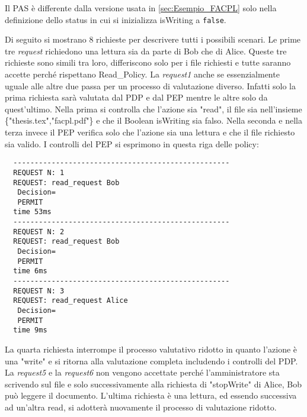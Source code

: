 Il \ac{PAS} è differente dalla versione usata in \ref{sec:Esempio_FACPL} solo nella definizione dello status
in cui si inizializza isWriting a \texttt{false}.
\clearpage

Di seguito si mostrano 8 richieste per descrivere tutti i possibili scenari.
Le prime tre \emph{request} richiedono una lettura sia da parte di Bob che di Alice. Queste tre richieste sono simili tra loro,
differiscono solo per i file richiesti e tutte saranno accette perché rispettano Read\_Policy. La \emph{request1} anche
se essenzialmente uguale alle altre due passa per un processo di valutazione diverso. Infatti solo la prima richiesta
sarà valutata dal \ac{PDP} e dal \ac{PEP} mentre le altre solo da quest'ultimo. Nella prima si controlla che l'azione sia "read",
il file sia nell'insieme \{"thesis.tex","facpl.pdf"\} e che il Boolean isWriting sia falso. Nella seconda e nella terza
invece il \ac{PEP} verifica solo che l'azione sia una lettura e che il file richiesto sia valido.
I controlli del \ac{PEP} si esprimono in questa riga delle policy:


\begin{verbatim}
  ---------------------------------------------------
  REQUEST N: 1
  REQUEST: read_request Bob
   Decision=
   PERMIT
  time 53ms
  ---------------------------------------------------
  REQUEST N: 2
  REQUEST: read_request Bob
   Decision=
   PERMIT
  time 6ms
  ---------------------------------------------------
  REQUEST N: 3
  REQUEST: read_request Alice
   Decision=
   PERMIT
  time 9ms
\end{verbatim}
La quarta richiesta interrompe il processo valutativo ridotto in quanto l'azione è una "write" e si ritorna alla valutazione
completa includendo i controlli del \ac{PDP}. La \emph{request5} e la \emph{request6} non vengono accettate perché l'amministratore
sta scrivendo sul file e solo successivamente alla richiesta di "stopWrite" di Alice, Bob può leggere il documento.
L'ultima richiesta è una lettura, ed essendo successiva ad un'altra read, si adotterà nuovamente il processo di valutazione ridotto.

